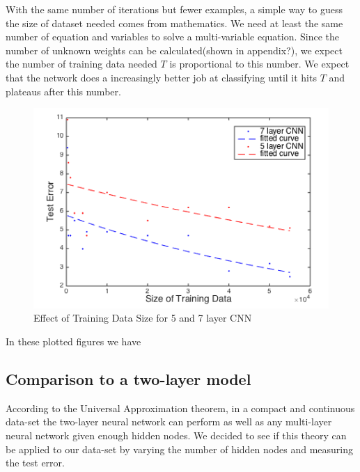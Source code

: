 \documentclass[12pt, twocolumn]{article}
\begin{document}
With the same number of iterations but fewer examples, a simple way to guess the size of dataset needed comes from mathematics.  We need at least the same number of equation and variables to solve a multi-variable equation. Since the number of unknown weights can be calculated(shown in appendix?), we expect the number of training data needed $T$ is proportional to this number. We expect that the network does a increasingly better job at classifying until it hits $T$ and plateaus after this number.

\begin{figure}[H]
\includegraphics[scale=.5]{trainingsize.png}
\caption{Effect of Training Data Size for 5 and 7 layer CNN}
\label{fig:trainsize}
\end{figure}


In these plotted figures we have 

\subsection{Comparison to a two-layer model}
According to the Universal Approximation theorem, in a compact and continuous data-set the two-layer neural network can perform as well as any multi-layer neural network given enough hidden nodes. We decided to see if this theory can be applied to our data-set by varying the number of hidden nodes and measuring the test error.
 
\end{document}
